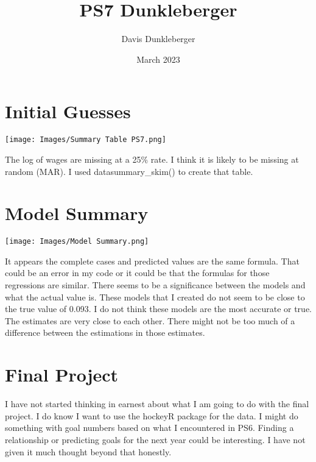 \documentclass{article}
\title{PS7 Dunkleberger}
\author{Davis Dunkleberger}
\date{March 2023}
\begin{document}
\maketitle

\section{Initial Guesses}
\texttt{[image: Images/Summary Table PS7.png]}

The log of wages are missing at a 25\% rate. I think it is likely to be missing at random (MAR). I used datasummary\_skim() to create that table. 

\section{Model Summary}
\texttt{[image: Images/Model Summary.png]}

It appears the complete cases and predicted values are the same formula. That could be an error in my code or it could be that the formulas for those regressions are similar. There seems to be a significance between the models and what the actual value is. These models that I created do not seem to be close to the true value of 0.093. I do not think these models are the most accurate or true. The estimates are very close to each other. There might not be too much of a difference between the estimations in those estimates. 

\section{Final Project}
I have not started thinking in earnest about what I am going to do with the final project. I do know I want to use the hockeyR package for the data. I might do something with goal numbers based on what I encountered in PS6. Finding a relationship or predicting goals for the next year could be interesting. I have not given it much thought beyond that honestly. 
\end{document}
